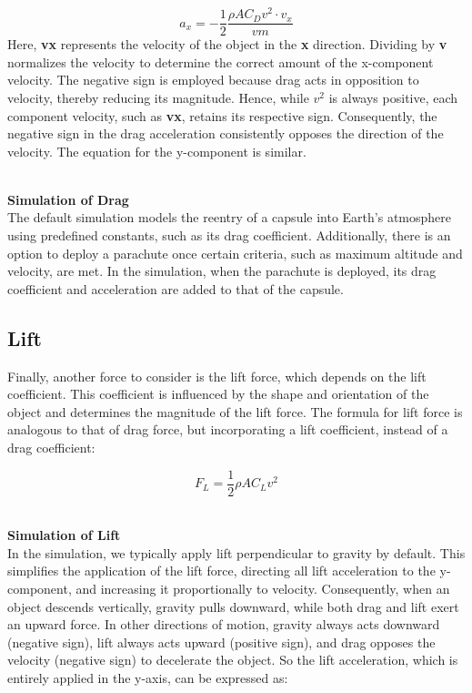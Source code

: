 \documentclass[runningheads]{llncs}
\begin{document}
\begin{equation}
a_x = - \frac{1}{2} \frac{\rho A C_D v^2 \cdot v_x}{v m}
\end{equation}
Here, \textbf{vx} represents the velocity of the object in the \textbf{x} direction. Dividing by \textbf{v} normalizes the velocity to determine the correct amount of the x-component velocity. The negative sign is employed because drag acts in opposition to velocity, thereby reducing its magnitude. Hence, while \( v^2 \) is always positive, each component velocity, such as \textbf{vx}, retains its respective sign. Consequently, the negative sign in the drag acceleration consistently opposes the direction of the velocity. The equation for the 
y-component is similar.

\textbf{\\Simulation of Drag\\}
The default simulation models the reentry of a capsule into Earth's atmosphere using predefined constants, such as its drag coefficient. Additionally, there is an option to deploy a parachute once certain criteria, such as maximum altitude and velocity, are met. In the simulation, when the parachute is deployed, its drag coefficient and acceleration are added to that of the capsule.




\subsection{Lift}
Finally, another force to consider is the lift force, which depends on the lift coefficient. This coefficient is influenced by the shape and orientation of the object and determines the magnitude of the lift force. The formula for lift force is analogous to that of drag force, but incorporating a lift coefficient, instead of a drag coefficient:

\begin{equation}
F_L = \frac{1}{2} \rho A C_L v^2
\end{equation}

\textbf{\\Simulation of Lift\\}
In the simulation, we typically apply lift perpendicular to gravity by default. This simplifies the application of the lift force, directing all lift acceleration to the y-component, and increasing it proportionally to velocity. Consequently, when an object descends vertically, gravity pulls downward, while both drag and lift exert an upward force. In other directions of motion, gravity always acts downward (negative sign), lift always acts upward (positive sign), and drag opposes the velocity (negative sign) to decelerate the object. So the lift acceleration, which is entirely applied in the y-axis, can be expressed as:
\end{document}
